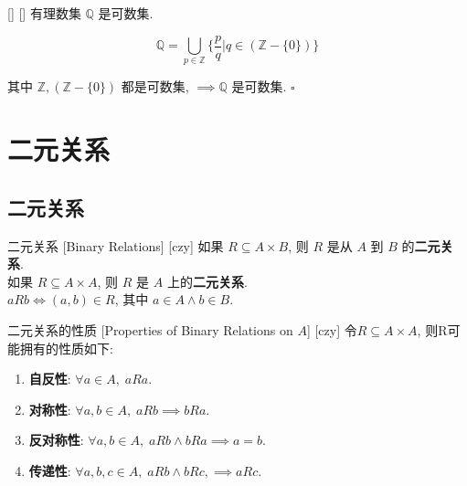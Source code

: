 \documentclass[UTF8]{ctexart}
\begin{document}
            \begin{thm}
                []
                {}
                []
                []
                有理数集 \(\mathbb{Q}\) 是可数集. 
            \end{thm}

            \begin{prf}
                \[\mathbb{Q}=\bigcup_{p\in\mathbb{Z}}\{\frac{p}{q}|q\in(\mathbb{Z}-\{0\})\}\]
                
                其中 \(\mathbb{Z}, (\mathbb{Z}-\{0\})\) 都是可数集,  \(\implies\mathbb{Q}\) 是可数集. 
                \(\square\)
            \end{prf}

\section{二元关系}

    \subsection{二元关系}
        \begin{dfn}
            [UUID]
            {二元关系}
            [Binary Relations]
            [czy]
            如果 \( R \subseteq A \times B \), 则 \( R \) 是从 \( A \) 到 \( B \) 的\textbf{二元关系}. \\
            如果 \( R \subseteq A \times A \), 则 \( R \) 是 \( A \) 上的\textbf{二元关系}. \\
            \( a R b \iff (a, b) \in R \), 其中 \( a \in A \land b \in B \). 
        \end{dfn}

        \begin{dfn}
            [UUID]
            {二元关系的性质}
            [Properties of Binary Relations on \( A \)]
            [czy]
            令\( R \subseteq A \times A \), 则R可能拥有的性质如下: 
            \begin{enumerate}
                \item \textbf{自反性}: \( \forall a \in A, \; a R a \). 
                \item \textbf{对称性}: \( \forall a, b \in A, \; a R b \implies b R a \). 
                \item \textbf{反对称性}: \( \forall a, b \in A, \; a R b \land b R a \implies a = b \). 
                \item \textbf{传递性}: \( \forall a, b, c \in A, \;  a R b \land b R c, \implies a R c \). 
            \end{enumerate}
        \end{dfn}
\end{document}
